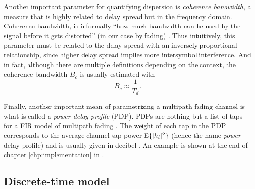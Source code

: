 Another important parameter for quantifying dispersion is \emph{coherence bandwidth}, a measure that is highly related to delay spread but in the frequency domain. Coherence bandwidth, is informally ``how much bandwidth can be used by the signal before it gets distorted'' (in our case by fading) \cite{Messier}. Thus intuitively, this parameter must be related to the delay spread with an inversely proportional relationship, since higher delay spread implies more intersymbol interference. And in fact, although there are multiple definitions depending on the context, the coherence bandwidth \(B_c\) is usually estimated with
\begin{equation}
	B_c \approx \frac{1}{T_d}.
\end{equation}

Finally, another important mean of parametrizing a multipath fading channel is what is called a \emph{power delay profile} (PDP). PDPs are nothing but a list of taps for a FIR model of multipath fading \cite{Mathis}. The weight of each tap in the PDP corresponds to the average channel tap power \(\operatorname{E}\{|h_l|^2\}\) (hence the name \emph{power} delay profile) and is usually given in decibel \cite{Mathis,Messier}. An example is shown at the end of chapter \ref{chp:implementation} in .


% 
% 

\subsection{Discrete-time model} \label{sec:discrete-time-model}


